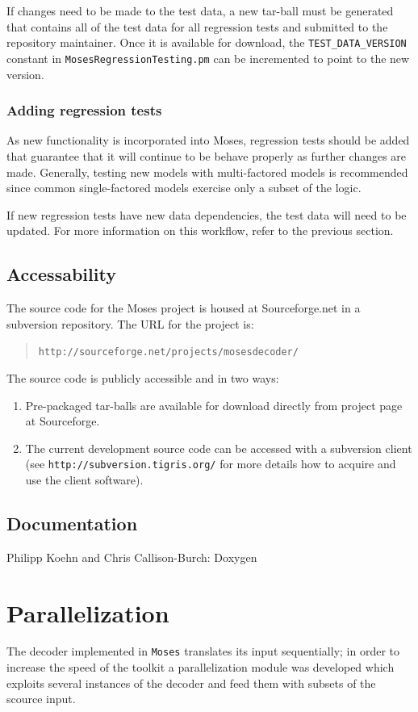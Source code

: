 \documentclass[11pt]{book}
\theoremstyle{plain}
\begin{document}
If changes need to be made to the test data, a new tar-ball must be
generated that contains all of the test data for all regression
tests and submitted to the repository maintainer.  Once it is
available for download, the \texttt{TEST\_DATA\_VERSION} constant in
\texttt{MosesRegressionTesting.pm} can be incremented to point to
the new version.

\subsubsection{Adding regression tests}
As new functionality is incorporated into Moses, regression tests
should be added that guarantee that it will continue to be behave
properly as further changes are made.  Generally, testing new models
with multi-factored models is recommended since common
single-factored models exercise only a subset of the logic.

If new regression tests have new data dependencies, the test data
will need to be updated.  For more information on this workflow,
refer to the previous section.

\subsection{Accessability}
The source code for the Moses project is housed at Sourceforge.net
in a subversion repository.  The URL for the project is:

\begin{quote}
    \texttt{http://sourceforge.net/projects/mosesdecoder/}
\end{quote}

The source code is publicly accessible and in two ways:
\begin{enumerate}
  \item Pre-packaged tar-balls are available for download directly
  from project page at Sourceforge.
  \item The current development source code can be accessed with a subversion client (see \texttt{http://subversion.tigris.org/}
for more details how to acquire and use the client software).
\end{enumerate}


\subsection{Documentation}
{\sc Philipp Koehn and Chris Callison-Burch: Doxygen}

\section{Parallelization}
The decoder implemented in {\tt Moses} translates its input sequentially; in order to increase 
the speed of the toolkit a parallelization module was developed which exploits several instances of the decoder and feed them with subsets of the scource input.
\end{document}
